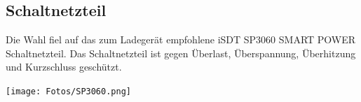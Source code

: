 \subsection{Schaltnetzteil}
Die Wahl fiel auf das zum Ladegerät empfohlene \glqq iSDT SP3060 SMART POWER Schaltnetzteil\grqq.
Das Schaltnetzteil ist gegen Überlast, Überspannung, Überhitzung und Kurzschluss geschützt. 

\begin{minipage}{13cm}
    \centering
    \texttt{[image: Fotos/SP3060.png]}
\end{minipage}

\newpage

